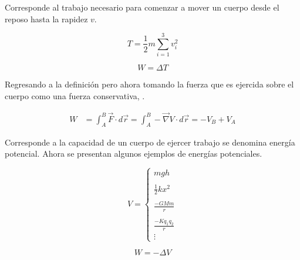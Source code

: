 \documentclass[/home/hernan/Documentos/Apuntes_mecanica_teorica/main.tex]{subfiles}
\begin{document}
	\begin{definition} Corresponde al trabajo necesario para comenzar a mover un cuerpo desde el reposo hasta la rapidez $v$.

		\begin{equation} 
			T =  \frac{1}{2} m \sum_{i=1}^{3} v_{i}^{2}
			\label{eq: Ttras}
		\end{equation}
	\end{definition}

	\begin{theorem}

		\begin{equation}
			W = \Delta T
			\label{eq: workT}
		\end{equation}
		
	\end{theorem}

	Regresando a la definición  pero ahora tomando la fuerza que es ejercida sobre el cuerpo como una fuerza conservativa, .

	\begin{align*}
		W &= \int_{A}^{B} \vec{F} \cdot d\vec{r} =  \int_{A}^{B} - \vec{\nabla}V \cdot d\vec{r} = -V_{B} + V_{A}
	\end{align*}

	\begin{definition} Corresponde a la capacidad de un cuerpo de ejercer trabajo se denomina energía potencial. Ahora se presentan algunos ejemplos de energías potenciales.

		\begin{equation}
			V = \left \{ \begin{matrix}
				mgh\\ 
				\\
				\frac{1}{2}kx^{2} \\
				\\
				\frac{-GMm}{r}\\ 
				\\
				\frac{-Kq_{1}q_{2}}{r}\\ 
				\vdots 
				\end{matrix} \right .
		\end{equation}
	\end{definition}

	\begin{theorem}

		\begin{equation}
			W = - \Delta V
			\label{eq: workV}
		\end{equation}
		
	\end{theorem}
\end{document}
